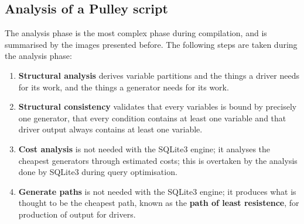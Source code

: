 \documentclass[a4paper]{article}
\begin{document}
\subsection{Analysis of a Pulley script}

The analysis phase is the most complex phase during compilation, and is summarised by the images presented before.  The following steps are taken during the analysis phase:
\begin{enumerate}
\item\textbf{Structural analysis} derives variable partitions and the things a driver needs for its work, and the things a generator needs for its work.
\item\textbf{Structural consistency} validates that every variables is bound by precisely one generator, that every condition contains at least one variable and that driver output always contains at least one variable.
\item\textbf{Cost analysis} is not needed with the SQLite3 engine; it analyses the cheapest generators through estimated costs; this is overtaken by the analysis done by SQLite3 during query optimisation.
\item\textbf{Generate paths} is not needed with the SQLite3 engine; it produces what is thought to be the cheapest path, known as the \textbf{path of least resistence}, for production of output for drivers.
\end{enumerate}
\end{document}
